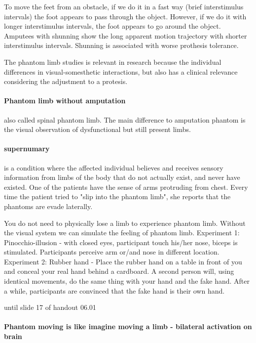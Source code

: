 \documentclass[12pt,article,oneside,a4paper]{memoir}
\begin{document}
To move the feet from an obstacle, if we do it in a fast way (brief interstimulus intervals) the foot appears to pass through the object. However, if we do it with longer interstimulus intervals, the foot appears to go around the object.
Amputees with shunning show the long apparent motion trajectory with shorter interstimulus intervals. Shunning is associated with worse prothesis tolerance.

The phantom limb studies is relevant in research because the individual differences in visual-somesthetic interactions, but also has a clinical relevance considering the adjustment to a protesis.

\paragraph{Phantom limb without amputation} also called spinal phantom limb. The main difference to amputation phantom is the visual observation of dysfunctional but still present limbs. 

\paragraph{supernumary} is a condition where the affected individual believes and receives sensory information from limbs of the body that do not actually exist, and never have existed. One of the patients have the sense of arms protruding from chest. Every time the patient tried to "slip into the phantom limb", she reports that the phantoms are evade laterally.

You do not need to physically lose a limb to experience phantom limb. Without the visual system we can simulate the feeling of phantom limb. 
Experiment 1: Pinocchio-illusion - with closed eyes, participant touch his/her nose, biceps is stimulated. Participants perceive arm or/and nose in different location.
Experiment 2: Rubber hand - Place the rubber hand on a table in front of you and conceal your real hand behind a cardboard. A second person will, using identical movements, do the same thing with your hand and the fake hand. After a while, participants are convinced that the fake hand is their own hand.


until slide 17 of handout 06.01


\paragraph{Phantom moving is like imagine moving a limb - bilateral activation on brain}
\end{document}

